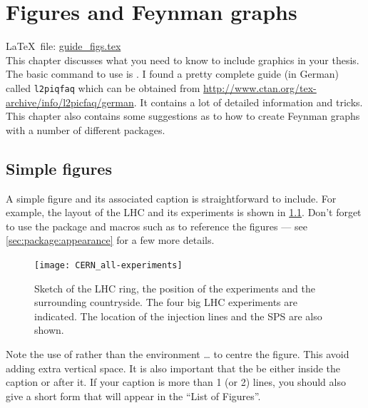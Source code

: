 
\chapter{Figures and Feynman graphs}%
\label{sec:fig}

\LaTeX\ file: \href{run:./guide_figs.tex}{guide\_figs.tex}\\[1ex]
\noindent
This chapter discusses what you need to know to include graphics in
your thesis. The basic command to use is .
I found a pretty complete guide (in German) called \texttt{l2piqfaq}
which can be obtained from
\url{http://www.ctan.org/tex-archive/info/l2picfaq/german}. It contains
a lot of detailed information and tricks.
This chapter also contains some suggestions as to how to create Feynman
graphs with a number of different packages.


\section{Simple figures}%
\label{sec:fig:simple}

A simple figure and its associated caption is straightforward to include.
For example, the layout of the LHC and its experiments is
shown in \cref{fig:LHC}.
Don't forget to use the package  and macros such as 
to reference the figures --- see \cref{sec:package:appearance} for a few more details.

\begin{figure}[htbp]
\begin{tcblisting}{}
\centering
\texttt{[image: CERN\_all-experiments]}
\caption[Sketch of the LHC ring, the position of the experiments and
  the surrounding countryside.]{Sketch of the LHC ring, the position
  of the experiments and the surrounding countryside. The four big
  LHC experiments are indicated. The location of the injection lines
  and the SPS are also shown.}%
\label{fig:LHC}
\end{tcblisting}
\end{figure}

Note the use of  rather than the environment
 \ldots {} to centre the figure. This
avoid adding extra vertical space. It is also important that the
 be either inside the caption or after it. If your
caption is more than 1 (or 2) lines, you should also give a short form
that will appear in the ``List of Figures''.

